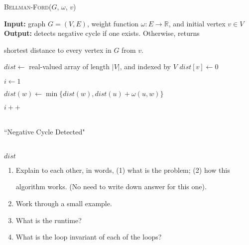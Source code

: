\documentclass{article}
\def\R{{\mathbb R}}
\begin{document}
\begin{algorithm}\caption{\textsc{Bellman-Ford}($G$, $\omega$, $v$)}\label{alg:seb}

    {\bf Input:} graph $G=(V,E)$, weight function $\omega \colon E \to \R$, and initial vertex $v \in V$ \\

    {\bf Output:} detects negative cycle if one exists.  Otherwise, returns

    shortest distance to every vertex in $G$ from $v$.\\

    \begin{algorithmic}[1]

        \State $dist \gets$ real-valued array of length $|V|$, and indexed by $V$
        \State $dist[v] \gets 0$

        \State $i \gets 1$





                \State $dist(w) \gets \min \{ dist(w), dist(u)+ \omega(u,w) \}$

            \EndFor

            \State $i++$

        \EndWhile




            \\

                \quad\quad\quad \Return ``Negative Cycle Detected"

            \EndIf

        \EndFor\\

        \Return $dist$

    \end{algorithmic}

\end{algorithm}



\begin{enumerate}

    \item Explain to each other, in words, (1) what is the problem; (2) how this

        algorithm works.  (No need to write down answer for this one).

    \item Work through a small example.

    \item What is the runtime?

    \item What is the loop invariant of each of the loops?

\end{enumerate}
\end{document}
